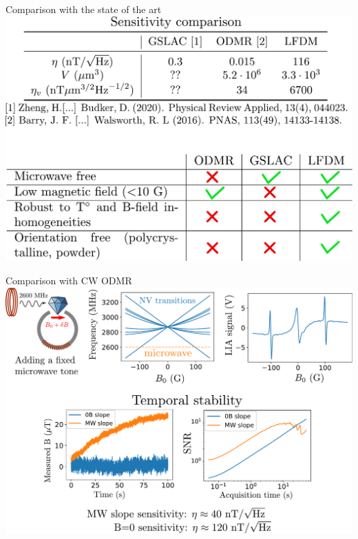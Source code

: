 \documentclass{beamer}
\begin{document}
\begin{frame}{Comparison with the state of the art}
\centering
\includegraphics[width=\textwidth,height=0.85\textheight,keepaspectratio]{Slide_comparison_litterature}
\end{frame}

\begin{frame}{Comparison with CW ODMR}
\centering
\includegraphics[width=\textwidth,height=0.85\textheight,keepaspectratio]{Slide_comparison_microwave}
\end{frame}
\end{document}
